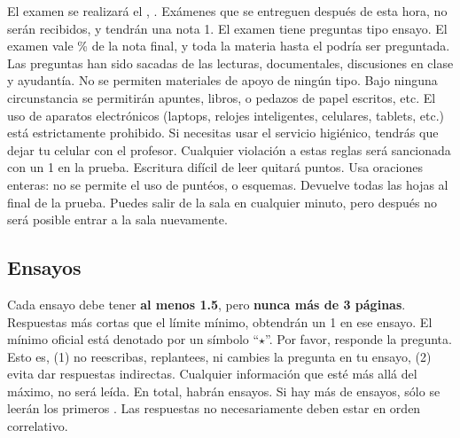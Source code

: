 \documentclass{article}
\begin{document}
El examen se realizar\'a el \underline{{\unskip}}, {\unskip}. Ex\'amenes que se entreguen despu\'es de esta hora, no ser\'an recibidos, y tendr\'an una nota 1. El examen tiene {\unskip} preguntas tipo ensayo. El examen vale {\unskip}\% de la nota final, y toda la materia hasta el {\unskip} podr\'ia ser preguntada. Las preguntas han sido sacadas de las lecturas, documentales, discusiones en clase y ayudant\'ia. No se permiten materiales de apoyo de ning\'un tipo. Bajo ninguna circunstancia se permitir\'an apuntes, libros, o pedazos de papel escritos, etc. El uso de aparatos electr\'onicos (laptops, relojes inteligentes, celulares, tablets, etc.) est\'a estrictamente prohibido. Si necesitas usar el servicio higi\'enico, tendr\'as que dejar tu celular con el profesor. Cualquier violaci\'on a estas reglas ser\'a sancionada con un 1 en la prueba.  Escritura dif\'icil de leer quitar\'a puntos. Usa oraciones enteras: no se permite el uso de punt\'eos, o esquemas. Devuelve todas las hojas al final de la prueba. Puedes salir de la sala en cualquier minuto, pero despu\'es no ser\'a posible entrar a la sala nuevamente. 


 

\subsection*{Ensayos}

Cada ensayo debe tener {\bf al menos 1.5}, pero {\bf nunca m\'as de 3 p\'aginas}. Respuestas m\'as cortas que el l\'imite m\'inimo, obtendr\'an un 1 en ese ensayo. El m\'inimo oficial est\'a denotado por un s\'imbolo ``$\star$''. Por favor, responde la pregunta. Esto es, (1) no reescribas, replantees, ni cambies la pregunta en tu ensayo, (2) evita dar respuestas indirectas. Cualquier informaci\'on que est\'e m\'as all\'a del m\'aximo, no ser\'a le\'ida. En total, habr\'an {\unskip} ensayos. Si hay m\'as de {\unskip} ensayos, s\'olo se leer\'an los primeros {\unskip}. Las respuestas no necesariamente deben estar en orden correlativo.
\\
\end{document}
